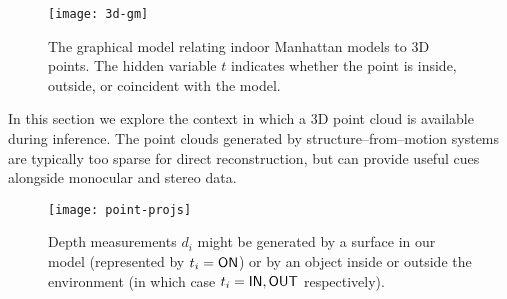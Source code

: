 \begin{figure}[tb]
  \centering
  \texttt{[image: 3d-gm]}
  \caption{The graphical model relating indoor Manhattan models to 3D
    points. The hidden variable $t$ indicates whether the point is
    inside, outside, or coincident with the model.}
  \label{fig:3d-gm}
\end{figure}

In this section we explore the context in which a 3D point cloud is
available during inference. The point clouds generated by
structure--from--motion systems are typically too sparse for direct
reconstruction, but can provide useful cues alongside monocular and
stereo data.

\begin{figure}[tb]
  \centering \texttt{[image: point-projs]}
  \caption{Depth measurements $d_i$ might be generated by a surface in
    our model (represented by $t_i=\ON$) or by an object inside or
    outside the environment (in which case $t_i=\IN,\OUT$
    respectively).}
  \label{fig:point-projs}
\end{figure}



